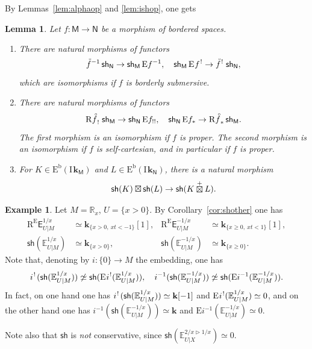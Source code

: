 \documentclass[JEP,XML,SOM,Unicode]{cedram}
\newenvironment{enumeratei}
{\bgroup\def\theenumi{\roman{enumi}}\def\theenumii{\alph{enumii}}\begin{enumerate}}
{\end{enumerate}\egroup}
\theoremstyle{plain}
\newtheorem{lemma}[theorem]{Lemma}
\theoremstyle{definition}
\newtheorem{example}[theorem]{Example}
\newcommand{\R}{\mathbb{R}}
\newcommand{\derived}[1]{\mathrm{#1}}
\newcommand{\dere}{\derived{E}}\let\enh\dere
\newcommand{\derr}{\derived{R}}
\newcommand{\BEC}[2][\ifield]{\dere^{\mathrm{b}}(#1_{#2})}
\newcommand{\roim}[1]{\derr#1_*}
\newcommand{\reim}[1]{\derr#1_{\mspace{.5mu}!}\mspace{2mu}}
\newcommand{\epb}[1]{#1^{\mspace{1.5mu}!}\mspace{2mu}}
\newcommand{\etens}[1][]{\mathbin{\boxtimes_{\raise1.5ex\hbox to-.1em{}#1}}}
\newcommand{\RE}{\operatorname{R^\enh}}
\newcommand{\Eopb}[1]{\enh#1^{-1}}
\newcommand{\Eoim}[1]{\enh#1_*}
\newcommand{\Eeeim}[1]{\enh#1_{!!}}
\newcommand{\Eepb}[1]{\enh\mspace{1mu}#1^{\mspace{1.5mu}!}}
\newcommand{\field}{\mathbf{k}}\let\cor\field
\newcommand{\ind}{\mathrm{I}\mspace{2mu}}
\newcommand{\ifield}{\ind\field}
\newcommand{\unbordered}[1]{{\accentset{\circ}{#1}}}
\let\oo \unbordered
\newcommand{\cetens}{\mathbin{\mathop\boxtimes\limits^+}}
\newcommand{\range}[2]{#1 \mathbin{\rhd} #2}
\newcommand{\ex}{\mathsf{E}}\let\exx\ex
\newcommand{\sh}{\mathsf{sh}}
\newcommand{\bbM}{\mathsf{M}}
\newcommand{\bbN}{\mathsf{N}}
\newcommand{\Ex}{\mathbb{E}}
\newcommand{\st}[1]{{\{{#1}\}}}
\newcommand{\opb}[1]{#1^{-1}}
\begin{document}
By Lemmas~\ref{lem:alphaop} and \ref{lem:ishop}, one gets

\begin{lemma}\label{lem:shop}
Let $f\colon \bbM\to \bbN$ be a morphism of bordered spaces.
\begin{enumeratei}
\item\label{lem:shopi}
There are natural morphisms of functors
\[
\opb {\smash{\oo f}} \, \sh_{\bbN} \to \sh_{\bbM} \, \Eopb f, \quad
\sh_{\bbM} \, \Eepb f \to \epb {\smash{\oo f}} \, \sh_{\bbN},
\]
which are isomorphisms if $f$ is borderly submersive.
\item\label{lem:shopii}
There are natural morphisms of functors
\[
\reim{\oo f} \, \sh_{\bbM} \to \sh_{\bbN} \, \Eeeim f, \quad
\sh_{\bbN} \, \Eoim f \to \roim{\oo f} \, \sh_{\bbM}.
\]
The first morphism is an isomorphism if $f$ is proper.
The second morphism is an isomorphism if $f$ is self-cartesian,
and in particular if $f$ is proper.
\item\label{lem:shopiii}
For $K\in\BEC\bbM$ and $L\in\BEC\bbN$,
there is a natural morphism
\[
\sh(K)\etens\sh(L)\to\sh(K\cetens L).
\]
\end{enumeratei}
\end{lemma}

\begin{example}\label{exam:310}
Let $M=\R_x$, $U=\st{x>0}$.
By Corollary~\ref{cor:shother} one has
\begin{align*}
\RE\ex^{1/x}_{U|M} &\simeq \field_{\st{x>0,\ xt<-1}}[1], &
\RE\ex^{-1/x}_{U|M} &\simeq \field_{\st{x\geq0,\ xt<1}}[1], \\
\sh(\Ex^{1/x}_{U|M}) &\simeq \field_{\st{x>0}}, &
\sh(\Ex^{-1/x}_{U|M}) &\simeq \field_{\st{x\geq0}}.
\end{align*}
Note that, denoting by $i\colon\st0\to M$ the embedding, one has
\[
\epb i (\sh (\Ex^{1/x}_{U|M})) \not\simeq \sh (\Eepb i (\Ex^{1/x}_{U|M})), \quad
\opb i (\sh (\Ex^{-1/x}_{U|M})) \not\simeq \sh (\Eopb i (\Ex^{-1/x}_{U|M})).
\]
In fact, on one hand one has $\epb i (\sh (\Ex^{1/x}_{U|M}))\simeq\field[-1]$ and $\Eepb i (\Ex^{1/x}_{U|M})\simeq 0$, and on the other hand one has $\opb i (\sh (\Ex^{-1/x}_{U|M}))\simeq\field$ and $\Eopb i (\Ex^{-1/x}_{U|M})\simeq0$.

Note also that $\sh$ is \emph{not} conservative, since $\sh(\Ex_{U|X}^{\range{2/x}{1/x}})\simeq 0$.
\end{example}
\end{document}

